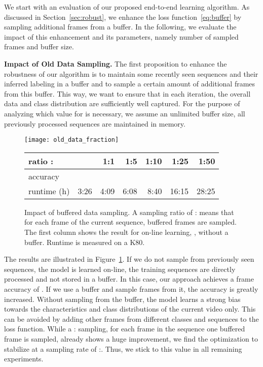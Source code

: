 \documentclass[10pt,twocolumn,letterpaper]{article}
\begin{document}
We start with an evaluation of our proposed end-to-end learning algorithm. As discussed in Section~\ref{sec:robust}, we enhance the loss function~\eqref{eq:buffer} by sampling additional frames from a buffer. In the following, we evaluate the impact of this enhancement and its parameters, namely number of sampled frames and buffer size.  



\textbf{Impact of Old Data Sampling.}
The first proposition to enhance the robustness of our algorithm is to maintain
some recently seen sequences and their inferred labeling in a buffer and to sample
a certain amount  of additional frames from this buffer. This way, we want
to ensure that in each iteration, the overall data and class distribution are
sufficiently well captured. For the purpose of analyzing which value for 
is necessary, we assume an unlimited buffer size, \ie all previously processed
sequences are maintained in memory.
\begin{figure}[tb]
    \centering
    \texttt{[image: old\_data\_fraction]}
    \footnotesize
    \begin{tabularx}{0.48\textwidth}{Xrrrrrr}
        \toprule
            ratio :    &     & 1:1      & 1:5      & 1:10     & 1:25     & 1:50     \\
        \midrule
            accuracy         &  &  &  &  &  &  \\
            runtime (h)      & 3:26     & 4:09     & 6:08     & 8:40     & 16:15   & 28:25     \\
        \bottomrule
    \end{tabularx}
    \caption{\label{fig:bufferedDataSampling}
		Impact of buffered data sampling. A sampling ratio of : means that for each frame of
             the current sequence,  buffered frames are sampled.
             The first column shows the result for on-line learning, \ie, without a buffer.
             Runtime is measured on a K80.}
    \vspace{-0.5cm}
\end{figure}
The results are illustrated in Figure~\ref{fig:bufferedDataSampling}.
If we do not sample from previously seen sequences, the model is learned on-line, \ie the training sequences are directly processed and not stored in a buffer. In this case, our approach achieves a frame accuracy of . If we use a buffer and sample frames from it, the accuracy is greatly increased. 
Without sampling from the buffer, the model learns a strong bias towards the characteristics
and class distributions of the current video only. This can be avoided by adding
other frames from different classes and sequences to the loss function. While a
: sampling, \ie for each frame in the sequence one buffered frame is sampled,
already shows a huge improvement, we find the optimization to stabilize at a sampling rate
of :. Thus, we stick to this value in all remaining experiments.
 
\end{document}
